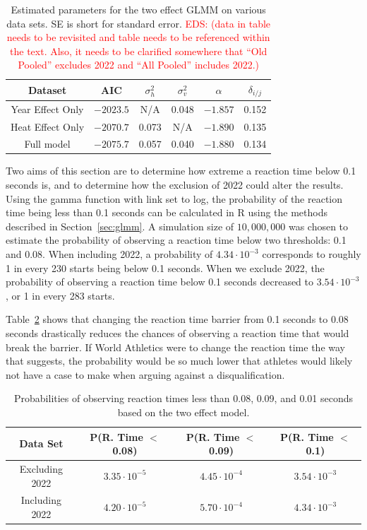 \documentclass[12pt, letterpaper, titlepage]{article}
\newcommand{\eds}[1]{\textcolor{red}{EDS: (#1)}}
\begin{document}
\begin{table}
  \centering
  \caption{Estimated parameters for the two effect GLMM on various data sets. SE
  is short for standard error. \eds{data in table needs to be revisited and table
	needs to be referenced within the text. Also, it needs to be clarified 
	somewhere that ``Old Pooled'' excludes 2022 and ``All Pooled'' includes 2022.}} 
  \begin{tabular}{c c c c c c}
      \toprule
      Dataset & AIC & $\sigma_h^2$ & $\sigma_v^2$ & $\alpha$ & $\delta_{i/j}$ \\
      \midrule
      Year Effect Only & $-2023.5$ & N/A & 0.048 & $-1.857$ & 0.152\\
      Heat Effect Only & $-2070.7$ & 0.073 & N/A & $-1.890$ & 0.135\\
      Full model       & $-2075.7$ & 0.057 & 0.040 & $-1.880$ & 0.134\\
      \bottomrule
  \end{tabular}
  \label{tab:Gamma_parameters}
\end{table}


Two aims of this section are to determine how extreme a reaction time below
0.1 seconds is, and to determine how the exclusion of 2022 could alter the results.
Using the gamma function with link set to log, the probability of the reaction 
time being less than 0.1 seconds can be calculated in R using the methods 
described in Section~\ref{sec:glmm}. A simulation size of $10,000,000$ was 
chosen to estimate the probability of observing a reaction time below 
two thresholds: 0.1 and 0.08. When including 2022, a probability
of $4.34\cdot10^{-3}$ corresponds to roughly 1 in every 230 starts
being below 0.1 seconds.  When we exclude 2022, the probability of observing a
reaction time below 0.1 seconds decreased to $3.54\cdot10^{-3}$, or 1 in every
283 starts.


Table~\ref{tab:Sim_probability} shows that changing the reaction time 
barrier from 0.1 seconds to 0.08 seconds drastically reduces the chances of 
observing a reaction time that would break the barrier. If World Athletics were
to change the reaction time the way that \citet{komi2009iaaf} suggests, the 
probability would be so much lower that athletes would likely not
have a case to make when arguing against a disqualification.


\begin{table}
  \centering
  \caption{Probabilities of observing reaction times less than 0.08, 0.09, and
  0.01 seconds based on the two effect model.}
  \begin{tabular}{c c c c} 
   \toprule
   Data Set & P(R. Time $<$ 0.08) & P(R. Time $<$ 0.09) & P(R. Time $<$ 0.1)  \\ 
   \midrule
   Excluding 2022 & $3.35\cdot10^{-5}$ & $4.45\cdot10^{-4}$ &  $3.54\cdot10^{-3}$  \\ 
   Including 2022 & $4.20\cdot10^{-5}$ & $5.70\cdot10^{-4}$ & $4.34\cdot10^{-3}$ \\
   \bottomrule
  \end{tabular}
  \label{tab:Sim_probability}
\end{table}
\end{document}
